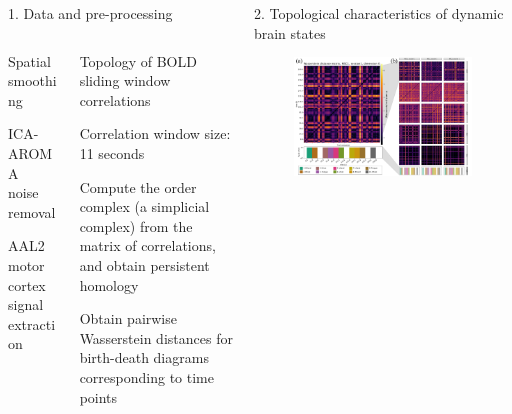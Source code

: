 \documentclass[final]{beamer}
\begin{document}
\begin{frame}{}
\begin{columns}
\begin{column}{0.65\textwidth}
\begin{block}{1. Data and pre-processing}
{{\begin{columns}
\begin{column}{0.49\textwidth}
\begin{itemize}
{                        \item Spatial smoothing
                        \item ICA-AROMA~\cite{Pruim2015} noise removal
                        \item AAL2~\cite{Rolls2015} motor cortex signal extraction
                    }
                    \end{itemize}
                \end{column}
                \begin{column}{0.45\textwidth}
                    Topology of BOLD sliding window correlations
                    \begin{itemize}
                        \small{
                        \item Correlation window size: 11 seconds
                        \item Compute the order complex (a simplicial complex) from the matrix of correlations, and obtain persistent homology 
                        \item Obtain pairwise Wasserstein distances for birth-death diagrams corresponding to time points
                        }
                    \end{itemize}
                \end{column}
            \end{columns}
            } %
            } %
        
        \end{block}
    \end{column}
    
    \begin{column}{0.34\textwidth}
        \begin{block}{2. Topological characteristics of dynamic brain states}
            \begin{figure}[H]
                \centering
                \includegraphics[width=\linewidth]{images/2-wmat.pdf}
                \label{fig:preproc}
            \end{figure}
        \end{block}
    \end{column} %
\end{columns}



\end{frame}
\end{document}
